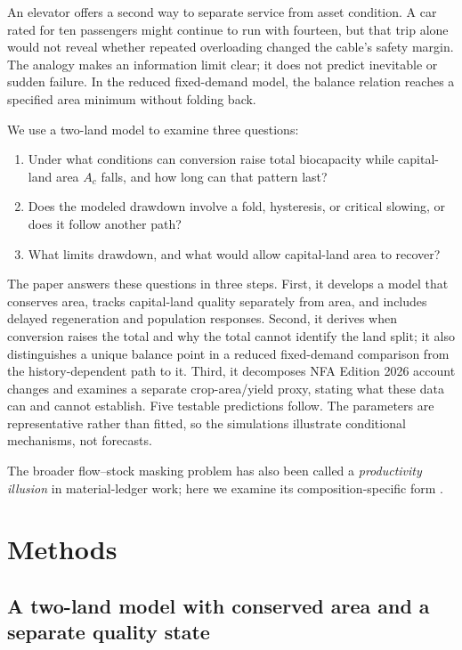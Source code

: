 \documentclass[preprint,12pt,authoryear]{elsarticle}
\begin{document}
An elevator offers a second way to separate service from asset condition. A car rated for ten passengers might continue to run with fourteen, but that trip alone would not reveal whether repeated overloading changed the cable's safety margin. The analogy makes an information limit clear; it does not predict inevitable or sudden failure. In the reduced fixed-demand model, the balance relation reaches a specified area minimum without folding back.

We use a two-land model to examine three questions:
\begin{enumerate}
\item Under what conditions can conversion raise total biocapacity while capital-land area $A_c$ falls, and how long can that pattern last?
\item Does the modeled drawdown involve a fold, hysteresis, or critical slowing, or does it follow another path?
\item What limits drawdown, and what would allow capital-land area to recover?
\end{enumerate}

The paper answers these questions in three steps. First, it develops a model that conserves area, tracks capital-land quality separately from area, and includes delayed regeneration and population responses. Second, it derives when conversion raises the total and why the total cannot identify the land split; it also distinguishes a unique balance point in a reduced fixed-demand comparison from the history-dependent path to it. Third, it decomposes NFA Edition 2026 account changes and examines a separate crop-area/yield proxy, stating what these data can and cannot establish. Five testable predictions follow. The parameters are representative rather than fitted, so the simulations illustrate conditional mechanisms, not forecasts.

The broader flow--stock masking problem has also been called a \emph{productivity illusion} in material-ledger work; here we examine its composition-specific form \citep{Abaee2026c}.

\section{Methods}\label{sec:model}

\subsection{A two-land model with conserved area and a separate quality state}\label{sec:equations}
\end{document}
